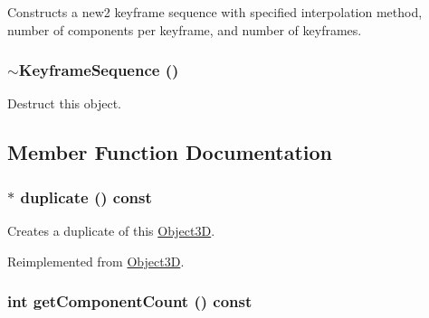 Constructs a new2 keyframe sequence with specified interpolation method, number of components per keyframe, and number of keyframes. \hypertarget{classm3g_1_1KeyframeSequence_464f5929e3302c788ca626c11ca8d656}{
\subsubsection[{$\sim$KeyframeSequence}]{\setlength{\rightskip}{0pt plus 5cm}$\sim${\bf KeyframeSequence} ()}}
\label{classm3g_1_1KeyframeSequence_464f5929e3302c788ca626c11ca8d656}


Destruct this object. 

\subsection{Member Function Documentation}
\hypertarget{classm3g_1_1KeyframeSequence_f925b7c3107b6cdba08dbb045b203b4f}{
\subsubsection[{duplicate}]{ $\ast$ duplicate () const}}
\label{classm3g_1_1KeyframeSequence_f925b7c3107b6cdba08dbb045b203b4f}


Creates a duplicate of this \hyperlink{classm3g_1_1Object3D}{Object3D}. 

Reimplemented from \hyperlink{classm3g_1_1Object3D_a25110dac934f867b83b73ad4741a0f4}{Object3D}.\hypertarget{classm3g_1_1KeyframeSequence_7016f51d2788e78fdd736efd040f5e5e}{
\subsubsection[{getComponentCount}]{\setlength{\rightskip}{0pt plus 5cm}int getComponentCount () const}}
\label{classm3g_1_1KeyframeSequence_7016f51d2788e78fdd736efd040f5e5e}



